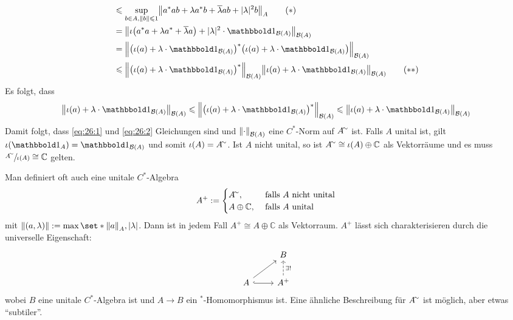\begin{beweis}
\begin{align}
		&\le \sup_{b \in A, \norm{b} \le 1} \norm[\big]{a^*ab + \lambda a^* b + \overline{\lambda} a b + \abs{\lambda}^2 b }_A \tag{$*$} \label{eq:26:1}\\
		&= \norm[\big]{\iota \enbrace*{a^* a + \lambda a^* + \overline{\lambda} a} + \abs{\lambda}^2 \cdot \ind_{\mathcal{B}(A)} }_{\mathcal{B}(A)} \\
		&= \norm*{ \enbrace*{\iota(a) + \lambda \cdot \ind_{\mathcal{B}(A)}}^* \enbrace*{\iota(a) + \lambda \cdot \ind_{\mathcal{B}(A)}}}_{\mathcal{B}(A)} \\
		&\le \norm*{\enbrace*{\iota(a) + \lambda \cdot \ind_{\mathcal{B}(A)}}^*}_{\mathcal{B}(A)} \norm*{\iota(a) + \lambda \cdot \ind_{\mathcal{B}(A)}}_{\mathcal{B}(A)}   
		\tag{$**$} \label{eq:26:2}
	\end{align}
	Es folgt, dass 
	\begin{align}
		\norm*{\iota(a) + \lambda \cdot \ind_{\mathcal{B}(A)}}_{\mathcal{B}(A)} \le \norm*{\enbrace*{\iota(a) + \lambda \cdot \ind_{\mathcal{B}(A)}}^*}_{\mathcal{B}(A)}
		\le \norm*{\iota(a) + \lambda \cdot \ind_{\mathcal{B}(A)}}_{\mathcal{B}(A)} 
	\end{align}
	Damit folgt, dass \eqref{eq:26:1} und \eqref{eq:26:2} Gleichungen sind und $\norm*{\cdot }_{\mathcal{B}(A)}$ eine $C^*$-Norm auf $A^\simm$ ist. Falls $A$ unital ist, gilt
	$\iota(\ind_A) = \ind_{\mathcal{B}(A)}$ und somit $\iota(A)=A^\simm$. Ist $A$ nicht unital, so ist $A^\simm \cong \iota(A) \oplus \mathbb{C}$ als Vektorräume und es muss
	$\sfrac{A^\simm}{\iota(A)}\cong \mathbb{C}$ gelten.
\end{beweis}

\begin{bemerkung}[{name=[Alternative Unitalisierung]},label=bem:27]
	Man definiert oft auch eine unitale $C^*$-Algebra 
	\[
		A^+ := \begin{cases}
			A^\simm, &\text{ falls }A \text{ nicht unital} \\
			A  \oplus \mathbb{C} , &\text{ falls } A \text{ unital} 
		\end{cases}
	\]
	mit $\norm*{(a,\lambda)} := \max \set*{\norm*{a}_A, \abs{\lambda}}$. Dann ist in jedem Fall $A^+ \cong A \oplus \mathbb{C}$ als Vektorraum. $A^+$ lässt sich charakterisieren 
	durch die universelle Eigenschaft:
	\[
		\begin{tikzcd}
			\mbox{ } & B \\
			A \rar[hook] \urar& A^+ \uar[dashed,"\exists !"']
		\end{tikzcd}
	\]
	wobei $B$ eine unitale $C^*$-Algebra ist und $A \to B$ ein ${}^*$-Homomorphismus ist. Eine ähnliche Beschreibung für $A^\simm$ ist möglich, aber etwas \enquote{subtiler}.
\end{bemerkung}

